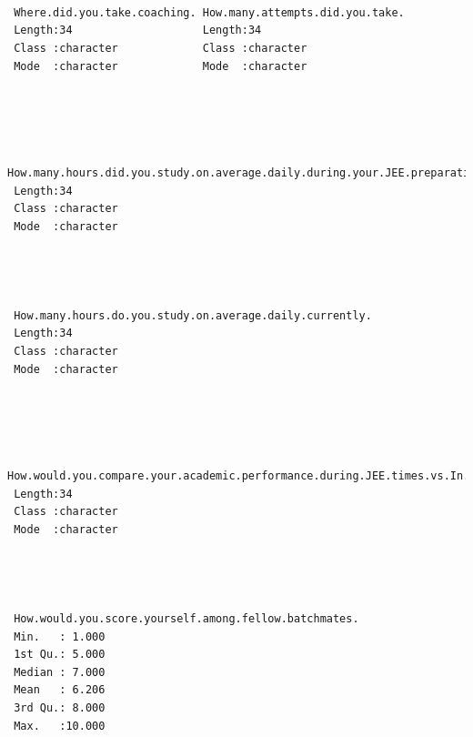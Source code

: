 \documentclass[
  letterpaper,
  DIV=11,
  numbers=noendperiod]{scrartcl}
\begin{document}
\begin{verbatim}
                                                                
                                                                
                                                                
 Where.did.you.take.coaching. How.many.attempts.did.you.take.
 Length:34                    Length:34                      
 Class :character             Class :character               
 Mode  :character             Mode  :character               
                                                             
                                                             
                                                             
                                                             
 How.many.hours.did.you.study.on.average.daily.during.your.JEE.preparation.
 Length:34                                                                 
 Class :character                                                          
 Mode  :character                                                          
                                                                           
                                                                           
                                                                           
                                                                           
 How.many.hours.do.you.study.on.average.daily.currently.
 Length:34                                              
 Class :character                                       
 Mode  :character                                       
                                                        
                                                        
                                                        
                                                        
 How.would.you.compare.your.academic.performance.during.JEE.times.vs.In.IIT.
 Length:34                                                                  
 Class :character                                                           
 Mode  :character                                                           
                                                                            
                                                                            
                                                                            
                                                                            
 How.would.you.score.yourself.among.fellow.batchmates.
 Min.   : 1.000                                       
 1st Qu.: 5.000                                       
 Median : 7.000                                       
 Mean   : 6.206                                       
 3rd Qu.: 8.000                                       
 Max.   :10.000                                       
                                                      
\end{verbatim}
\end{document}
